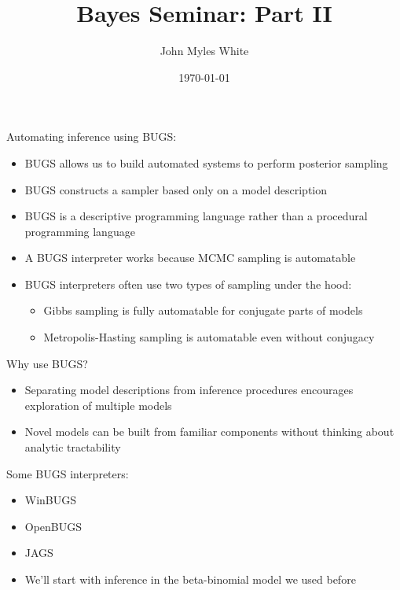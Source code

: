 \documentclass{beamer}
\title{Bayes Seminar: Part II}
\author{John Myles White}
\date{\today}
\begin{document}
\frame{\titlepage}

\frame
{
  Automating inference using BUGS:
  \begin{itemize}
    \item{BUGS allows us to build automated systems to perform posterior sampling}
    \item{BUGS constructs a sampler based only on a model description}
    \item{BUGS is a descriptive programming language rather than a procedural programming language}
  \end{itemize}
}

\frame
{
  \begin{itemize}
    \item{A BUGS interpreter works because MCMC sampling is automatable}
    \item{BUGS interpreters often use two types of sampling under the hood:}
    \begin{itemize}
      \item{Gibbs sampling is fully automatable for conjugate parts of models}
      \item{Metropolis-Hasting sampling is automatable even without conjugacy}
    \end{itemize}
  \end{itemize}
}

\frame
{
  Why use BUGS?
  \begin{itemize}
    \item{Separating model descriptions from inference procedures encourages exploration of multiple models}
    \item{Novel models can be built from familiar components without thinking about analytic tractability}
  \end{itemize}
}

\frame
{
  Some BUGS interpreters:
  \begin{itemize}
    \item{WinBUGS}
    \item{OpenBUGS}
    \item{JAGS}
  \end{itemize}
}

\begin{frame}
  \begin{itemize}
    \item{We'll start with inference in the beta-binomial model we used before}
  \end{itemize}
\end{frame}
\end{document}

